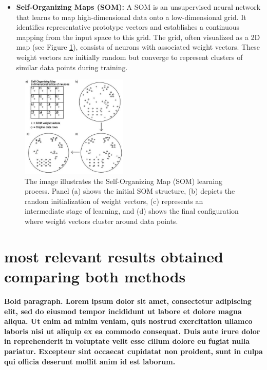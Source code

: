 \documentclass{llncs}
\begin{document}
\begin{itemize}
		\item \textbf{Self-Organizing Maps (SOM):} A SOM is an unsupervised neural network that learns to map high-dimensional data onto a low-dimensional grid. It identifies representative prototype vectors and establishes a continuous mapping from the input space to this grid. The grid, often visualized as a 2D map (see Figure \ref{fig:som}), consists of neurons with associated weight vectors. These weight vectors are initially random but converge to represent clusters of similar data points during training.
		
	
\end{itemize}

\begin{figure}[h!]
	\begin{center}  %
		\includegraphics[width=0.45\textwidth]{images/som.jpg}
		\caption{The image illustrates the Self-Organizing Map (SOM) learning process. Panel (a) shows the initial SOM structure, (b) depicts the random initialization of weight vectors, (c) represents an intermediate stage of learning, and (d) shows the final configuration where weight vectors cluster around data points.}
		\label{fig:som}
	\end{center}
\end{figure}

\section{most relevant results obtained comparing both methods}

\textbf{Bold paragraph. Lorem ipsum dolor sit amet, consectetur adipiscing elit, sed do eiusmod tempor incididunt ut labore et dolore magna aliqua. Ut enim ad minim veniam, quis nostrud exercitation ullamco laboris nisi ut aliquip ex ea commodo consequat. Duis aute irure dolor in reprehenderit in voluptate velit esse cillum dolore eu fugiat nulla pariatur. Excepteur sint occaecat cupidatat non proident, sunt in culpa qui officia deserunt mollit anim id est laborum.}
 
\end{document}
